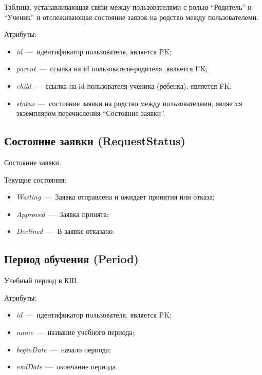 \documentclass[14pt]{article}
\begin{document}
Таблица, устанавливающая связи между пользователями с ролью ``Родитель'' и ``Ученик'' и отслеживающая состояние заявок на родство между пользователеми.

Атрибуты:
\begin{itemize}
	\item \emph{id}~---~идентификатор пользователя, является PK;
	\item \emph{parent}~---~ссылка на id пользователя-родителя, является FK;
	\item \emph{child}~---~ссылка на id пользователя-ученика (ребенка), является FK;
	\item \emph{status}~---~состояние заявки на родство между пользователями, является экземпляром перечисления ``Состояние заявки''.
\end{itemize}


\subsection{Состояние заявки (RequestStatus)}

Состояние заявки.

Текущие состояния:
\begin{itemize}
	\item \emph{Waiting}~---~Заявка отправлена и ожидает принятия или отказа;
	\item \emph{Approved}~---~Заявка принята;
	\item \emph{Declined}~---~В заявке отказано.
\end{itemize}

\subsection{Период обучения (Period)}

Учебный период в КШ.

Атрибуты:
\begin{itemize}
	\item \emph{id}~---~идентификатор пользователя, является PK;
	\item \emph{name}~---~название учебного периода;
	\item \emph{beginDate}~---~начало периода;
	\item \emph{endDate}~---~окончание периода.
\end{itemize}
	
\end{document}
